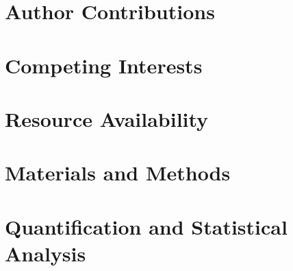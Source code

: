 \documentclass[11pt]{elife} %
\begin{document}
\begin{fullwidth}
\section{Author Contributions}




\section{Competing Interests}




\section{Resource Availability}




\section{Materials and Methods}




\section{Quantification and Statistical Analysis}




\nocite{*} 


\end{fullwidth}
\end{document}
